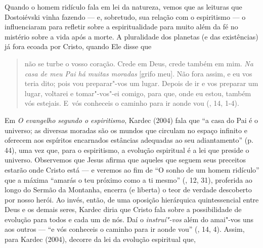 Quando o homem ridículo fala em lei da natureza, vemos que as leituras
que Dostoiévski vinha fazendo --- e, sobretudo, sua relação com o
espiritismo --- o influenciaram para refletir sobre a espiritualidade
para muito além da fé no mistério sobre a vida após a morte. A
pluralidade dos planetas (e das existências) já fora ecoada por Cristo,
quando Ele disse que

\begin{quote}
não se turbe o vosso coração. Crede em Deus, crede também em mim.
\emph{Na casa de meu Pai há muitas moradas} {[}grifo meu{]}. Não fora
assim, e eu vos teria dito; pois vou preparar"-vos um lugar. Depois de ir
e vos preparar um lugar, voltarei e tomar"-vos"-ei comigo, para que, onde
eu estou, também vós estejais. E~vós conheceis o caminho para ir aonde
vou (, 14, 1-4).
\end{quote}

Em \emph{O evangelho segundo o espiritismo}, Kardec (2004) fala que ``a
casa do Pai é o universo; as diversas moradas são os mundos que circulam
no espaço infinito e oferecem aos espíritos encarnados estâncias
adequadas ao seu adiantamento'' (p. 44), uma vez que, para o
espiritismo, a evolução espiritual é a lei que preside o universo.
Observemos que Jesus afirma que aqueles que seguem seus preceitos
estarão onde Cristo está --- e veremos ao fim de ``O sonho de um homem
ridículo'' que a máxima ``amarás o teu próximo como a ti mesmo''
(, 12, 31), proferida ao longo do Sermão da Montanha, encerra (e
liberta) o teor de verdade descoberto por nosso herói. Ao invés, então,
de uma oposição hierárquica quintessencial entre Deus e os demais seres,
Kardec diria que Cristo fala sobre a possibilidade de evolução para
todos e cada um de nós. Daí o \emph{instruí"-vos} além do amai"-vos uns
aos outros --- ``e vós conheceis o caminho para ir aonde vou'' (, 14,
4). Assim, para Kardec (2004), decorre da lei da evolução espiritual
que,

